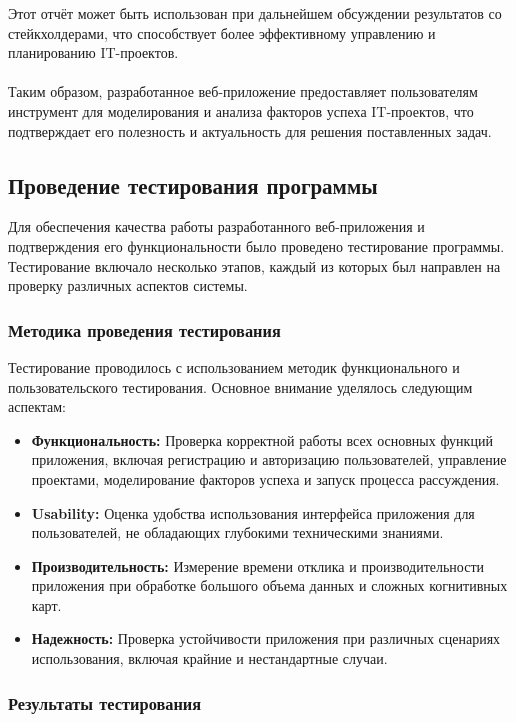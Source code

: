 \documentclass{article}
\begin{document}
    Этот отчёт может быть использован при дальнейшем обсуждении результатов со стейкхолдерами, что способствует более эффективному управлению и планированию IT-проектов.\\
    ~\\
    Таким образом, разработанное веб-приложение предоставляет пользователям инструмент для моделирования и анализа факторов успеха IT-проектов, что подтверждает его полезность и актуальность для решения поставленных задач.\\
    \subsection{Проведение тестирования программы}

    Для обеспечения качества работы разработанного веб-приложения и подтверждения его функциональности было проведено тестирование программы. Тестирование включало несколько этапов, каждый из которых был направлен на проверку различных аспектов системы.

    \subsubsection{Методика проведения тестирования}

    Тестирование проводилось с использованием методик функционального и пользовательского тестирования. Основное внимание уделялось следующим аспектам:
    \begin{itemize}
        \item \textbf{Функциональность:} Проверка корректной работы всех основных функций приложения, включая регистрацию и авторизацию пользователей, управление проектами, моделирование факторов успеха и запуск процесса рассуждения.
        \item \textbf{Usability:} Оценка удобства использования интерфейса приложения для пользователей, не обладающих глубокими техническими знаниями.
        \item \textbf{Производительность:} Измерение времени отклика и производительности приложения при обработке большого объема данных и сложных когнитивных карт.
        \item \textbf{Надежность:} Проверка устойчивости приложения при различных сценариях использования, включая крайние и нестандартные случаи.
    \end{itemize}

    \subsubsection{Результаты тестирования}
\end{document}
